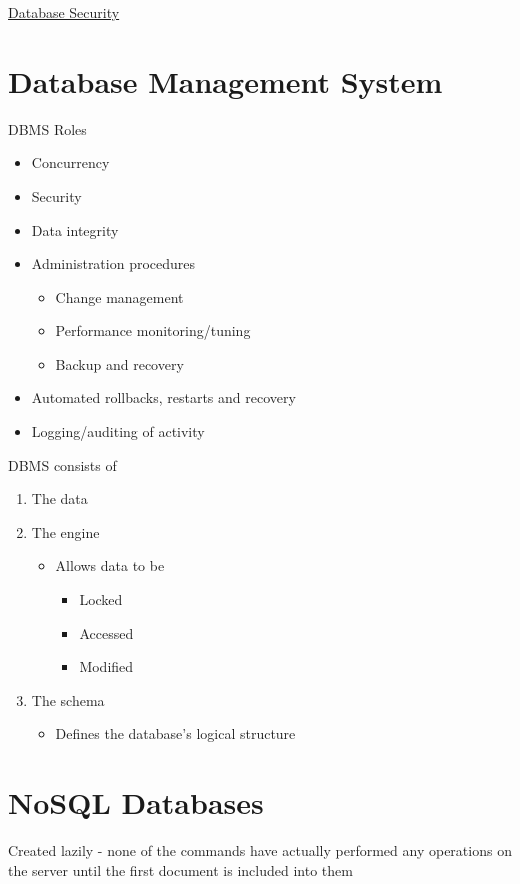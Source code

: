 \documentclass{article}[18pt]
\begin{document}
\begin{center}
\underline{\huge Database Security}
\end{center}
\section{Database Management System}
DBMS Roles
\begin{itemize}
	\item Concurrency
	\item Security
	\item Data integrity
	\item Administration procedures
	\begin{itemize}
		\item Change management
		\item Performance monitoring/tuning
		\item Backup and recovery
	\end{itemize}
	\item Automated rollbacks, restarts and recovery
	\item Logging/auditing of activity
\end{itemize}
DBMS consists of
\begin{enumerate}
	\item The data
	\item The engine
	\begin{itemize}
		\item Allows data to be
		\begin{itemize}
			\item Locked
			\item Accessed
			\item Modified
		\end{itemize}
	\end{itemize}
	\item The schema
	\begin{itemize}
		\item Defines the database's logical structure
	\end{itemize}
\end{enumerate}
\section{NoSQL Databases}
Created lazily - none of the commands have actually performed any operations on the server until the first document is included into them
\end{document}
